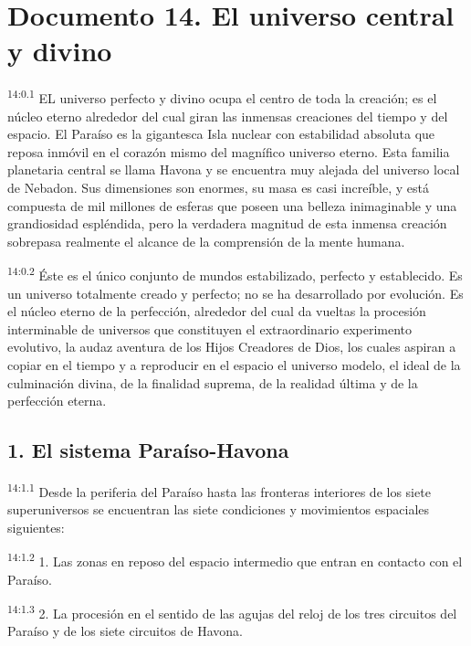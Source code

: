 \chapter{Documento 14. El universo central y divino}
\par
\textsuperscript{14:0.1} EL universo perfecto y divino ocupa el centro de toda la creación; es el núcleo eterno alrededor del cual giran las inmensas creaciones del tiempo y del espacio. El Paraíso es la gigantesca Isla nuclear con estabilidad absoluta que reposa inmóvil en el corazón mismo del magnífico universo eterno. Esta familia planetaria central se llama Havona y se encuentra muy alejada del universo local de Nebadon. Sus dimensiones son enormes, su masa es casi increíble, y está compuesta de mil millones de esferas que poseen una belleza inimaginable y una grandiosidad espléndida, pero la verdadera magnitud de esta inmensa creación sobrepasa realmente el alcance de la comprensión de la mente humana.

\par
\textsuperscript{14:0.2} Éste es el único conjunto de mundos estabilizado, perfecto y establecido. Es un universo totalmente creado y perfecto; no se ha desarrollado por evolución. Es el núcleo eterno de la perfección, alrededor del cual da vueltas la procesión interminable de universos que constituyen el extraordinario experimento evolutivo, la audaz aventura de los Hijos Creadores de Dios, los cuales aspiran a copiar en el tiempo y a reproducir en el espacio el universo modelo, el ideal de la culminación divina, de la finalidad suprema, de la realidad última y de la perfección eterna.

\section*{1. El sistema Paraíso-Havona}
\par
\textsuperscript{14:1.1} Desde la periferia del Paraíso hasta las fronteras interiores de los siete superuniversos se encuentran las siete condiciones y movimientos espaciales siguientes:

\par
\textsuperscript{14:1.2} 1. Las zonas en reposo del espacio intermedio que entran en contacto con el Paraíso.

\par
\textsuperscript{14:1.3} 2. La procesión en el sentido de las agujas del reloj de los tres circuitos del Paraíso y de los siete circuitos de Havona.

